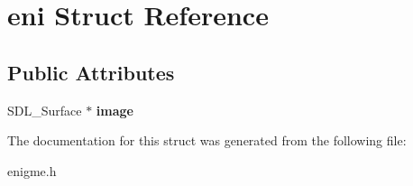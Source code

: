 \hypertarget{structeni}{}\section{eni Struct Reference}
\label{structeni}
\subsection*{Public Attributes}
\begin{DoxyCompactItemize}
\item 
\mbox{\label{structeni_ac525e1f70f62bd338e9f47e36e950012}} 
S\+D\+L\+\_\+\+Surface $\ast$ {\bfseries image}
\end{DoxyCompactItemize}


The documentation for this struct was generated from the following file\+:\begin{DoxyCompactItemize}
\item 
enigme.\+h\end{DoxyCompactItemize}

